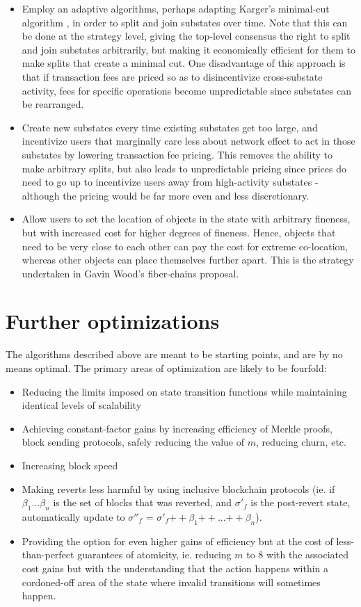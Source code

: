 \documentclass[11pt,a4paper]{report}
\theoremstyle{plain}
\theoremstyle{definition}
\theoremstyle{remark}
\begin{document}
\begin{itemize}
\item
Employ an adaptive algorithms, perhaps adapting Karger's minimal-cut algorithm \cite{karger}, in order to split and join substates over time. Note that this can be done at the strategy level, giving the top-level consensus the right to split and join substates arbitrarily, but making it economically efficient for them to make splits that create a minimal cut. One disadvantage of this approach is that if transaction fees are priced so as to disincentivize cross-substate activity, fees for specific operations become unpredictable since substates can be rearranged.
\item
Create new substates every time existing substates get too large, and incentivize users that marginally care less about network effect to act in those substates by lowering transaction fee pricing. This removes the ability to make arbitrary splits, but also leads to unpredictable pricing since prices do need to go up to incentivize users away from high-activity substates - although the pricing would be far more even and less discretionary.
\item
Allow users to set the location of objects in the state with arbitrary fineness, but with increased cost for higher degrees of fineness. Hence, objects that need to be very close to each other can pay the cost for extreme co-location, whereas other objects can place themselves further apart. This is the strategy undertaken in Gavin Wood's fiber-chains proposal\cite{fiberchains}.
\end{itemize}

\chapter{Further optimizations}

The algorithms described above are meant to be starting points, and are by no means optimal. The primary areas of optimization are likely to be fourfold:

\begin{itemize}
\item
Reducing the limits imposed on state transition functions while maintaining identical levels of scalability
\item
Achieving constant-factor gains by increasing efficiency of Merkle proofs, block sending protocols, safely reducing the value of $m$, reducing churn, etc.
\item
Increasing block speed
\item
Making reverts less harmful by using inclusive blockchain protocols (ie. if $\beta_1 ... \beta_n$ is the set of blocks that was reverted, and $\sigma'_f$ is the post-revert state, automatically update to $\sigma''_f$ = $\sigma'_f {++} \beta_1 {++} ... {++} \beta_n$).
\item
Providing the option for even higher gains of efficiency but at the cost of less-than-perfect guarantees of atomicity, ie. reducing $m$ to $8$ with the associated cost gains but with the understanding that the action happens within a cordoned-off area of the state where invalid transitions will sometimes happen.
\end{itemize}
\end{document}
